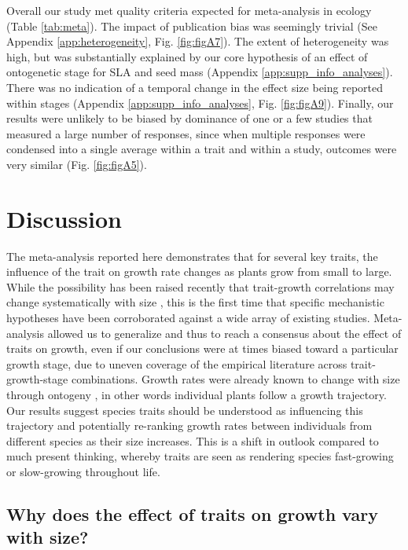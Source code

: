 \documentclass[a4paper,11pt]{article}
\begin{document}
Overall our study met quality criteria expected for meta-analysis in ecology (Table \ref{tab:meta}). The impact of publication bias was seemingly trivial (See Appendix \ref{app:heterogeneity}, Fig. \ref{fig:figA7}). The extent of heterogeneity was high, but was substantially explained by our core hypothesis of an effect of ontogenetic stage for SLA and seed mass (Appendix \ref{app:supp_info_analyses}). There was no indication of a temporal change in the effect size being reported within stages (Appendix \ref{app:supp_info_analyses}, Fig. \ref{fig:figA9}). Finally, our results were unlikely to be biased by dominance of one or a few studies that measured a large number of responses, since when multiple responses were condensed into a single average within a trait and within a study, outcomes were very similar (Fig. \ref{fig:figA5}).


\section*{Discussion}\label{discussion}

The meta-analysis reported here demonstrates that for several key traits, the influence of the trait on growth rate changes as plants grow from small to large. While the possibility has been raised recently that trait-growth correlations may change systematically with size \citep{Falster:2011ii, Ruger:2012jv, Iida:2014ep, Iida:2014hq}, this is the first time that specific mechanistic hypotheses have been corroborated against a wide array of existing studies. Meta-analysis allowed us to generalize and thus to reach a consensus about the effect of traits on growth, even if our conclusions were at times biased toward a particular growth stage, due to uneven coverage of the empirical literature across trait-growth-stage combinations. Growth rates were already known to change with size through ontogeny \citep{Condit:1993hd, Clark:1999ed, Herault:2011dd}, in other words individual plants follow a growth trajectory. Our results suggest species traits should be understood as influencing this trajectory and potentially re-ranking growth rates between individuals from different species as their size increases. This is a shift in outlook compared to much present thinking, whereby traits are seen as rendering species fast-growing or slow-growing throughout life.

\subsection*{Why does the effect of traits on growth vary with size?}
\end{document}
